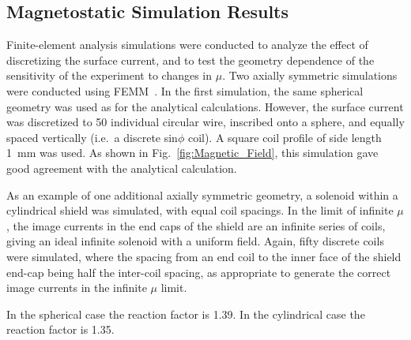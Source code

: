 \documentclass[review]{elsarticle}
\begin{document}
\subsection{Magnetostatic Simulation Results}

Finite-element analysis simulations were conducted to analyze the
effect of discretizing the surface current, and to test the geometry
dependence of the sensitivity of the experiment to changes in $\mu$.
Two axially symmetric simulations were conducted using
FEMM~\cite{bib:femm}.  In the first simulation, the same spherical geometry was
used as for the analytical calculations.  However, the surface current
was discretized to 50 individual circular wire, inscribed onto a
sphere, and equally spaced vertically (i.e.~a discrete sin$\phi$
coil).  A square coil profile of side length 1~mm was used.  As shown
in Fig.~\ref{fig:Magnetic_Field}, this simulation gave good agreement
with the analytical calculation.

As an example of one additional axially symmetric geometry, a solenoid
within a cylindrical shield was simulated, with equal coil spacings.
In the limit of infinite $\mu$, the image currents in the end caps of
the shield are an infinite series of coils, giving an ideal infinite
solenoid with a uniform field.  Again, fifty discrete coils were
simulated, where the spacing from an end coil to the inner face of the
shield end-cap being half the inter-coil spacing, as appropriate to
generate the correct image currents in the infinite $\mu$ limit. 


In the spherical case the reaction factor is 1.39.  In the cylindrical
case the reaction factor is 1.35.  
\end{document}
